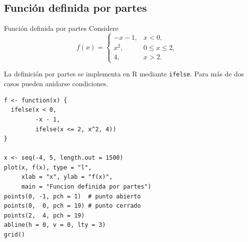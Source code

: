 \documentclass[aspectratio=169,10pt]{beamer}
\begin{document}
\subsection{Función definida por partes}
\begin{frame}{Función definida por partes}
Considere
\[
f(x)=
\begin{cases}
-x-1,&x<0,\\
x^2,&0\leq x\leq2,\\
4,&x>2.
\end{cases}
\]

La definición por partes se implementa en R mediante \texttt{ifelse}. Para más
de dos casos pueden anidarse condiciones.

\begin{center}
\end{center}

\begin{verbatim}
f <- function(x) {
  ifelse(x < 0,
         -x - 1,
         ifelse(x <= 2, x^2, 4))
}

x <- seq(-4, 5, length.out = 1500)
plot(x, f(x), type = "l",
     xlab = "x", ylab = "f(x)",
     main = "Funcion definida por partes")
points(0, -1, pch = 1)  # punto abierto
points(0,  0, pch = 19) # punto cerrado
points(2,  4, pch = 19)
abline(h = 0, v = 0, lty = 3)
grid()
\end{verbatim}

\end{frame}
\end{document}
